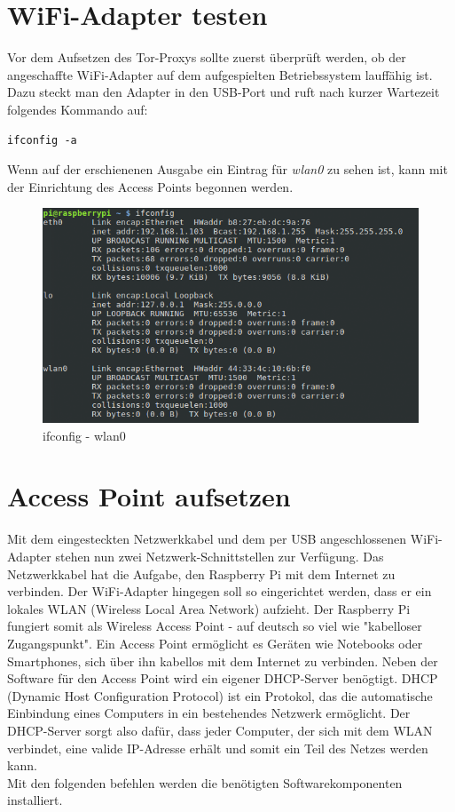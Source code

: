 \section{WiFi-Adapter testen}
Vor dem Aufsetzen des Tor-Proxys sollte zuerst überprüft werden, ob der angeschaffte WiFi-Adapter auf dem aufgespielten Betriebssystem lauffähig ist. Dazu steckt man den Adapter in den USB-Port und ruft nach kurzer Wartezeit folgendes Kommando auf:

\begin{lstlisting}
ifconfig -a
\end{lstlisting}

Wenn auf der erschienenen Ausgabe ein Eintrag für \textit{wlan0} zu sehen ist, kann mit der Einrichtung des Access Points begonnen werden.

\begin{figure}[H]
\centering
\includegraphics[scale=0.7]{images/ifconfig}
\caption{ifconfig - wlan0}
\end{figure}

\section{Access Point aufsetzen}
Mit dem eingesteckten Netzwerkkabel und dem per USB angeschlossenen WiFi-Adapter stehen nun zwei Netzwerk-Schnittstellen zur Verfügung. Das Netzwerkkabel hat die Aufgabe, den Raspberry Pi mit dem Internet zu verbinden. Der WiFi-Adapter hingegen soll so eingerichtet werden, dass er ein lokales WLAN (Wireless Local Area Network) aufzieht. Der Raspberry Pi fungiert somit als Wireless Access Point - auf deutsch so viel wie "kabelloser Zugangspunkt". Ein Access Point ermöglicht es Geräten wie Notebooks oder Smartphones, sich über ihn kabellos mit dem Internet zu verbinden. Neben der Software für den Access Point wird ein eigener DHCP-Server benögtigt. DHCP (Dynamic Host Configuration Protocol) ist ein Protokol, das die automatische Einbindung eines Computers in ein bestehendes Netzwerk ermöglicht. Der DHCP-Server sorgt also dafür, dass jeder Computer, der sich mit dem WLAN verbindet, eine valide IP-Adresse erhält und somit ein Teil des Netzes werden kann.
\\
Mit den folgenden befehlen werden die benötigten Softwarekomponenten installiert.
 
